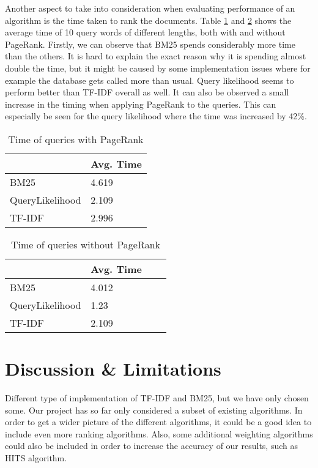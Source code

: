 Another aspect to take into consideration when evaluating performance of an algorithm is the time taken to rank the documents. Table \ref{tab:time} and \ref{tab:time_pr} shows the average time of 10 query words of different lengths, both with and without PageRank. Firstly, we can observe that BM25 spends considerably more time than the others. It is hard to explain the exact reason why it is spending almost double the time, but it might be caused by some implementation issues where for example the database gets called more than usual. Query likelihood seems to perform better than TF-IDF overall as well. It can also be observed a small increase in the timing when applying PageRank to the queries. This can especially be seen for the query likelihood where the time was increased by 42\%.

\begin{table}[!h]
\centering
\caption{Time of queries with PageRank}
\label{tab:time}
\begin{tabular}{|l|l|}
\hline
        & Avg. Time  \\ \hline
BM25            & 4.619 \\ \hline
QueryLikelihood & 2.109\\ \hline
TF-IDF          & 2.996\\ \hline
\end{tabular}
\end{table}

\begin{table}[!h]
\centering
\caption{Time of queries without PageRank}
\label{tab:time_pr}
\begin{tabular}{|l|l|l|l|}
\hline
        & Avg. Time  \\ \hline
BM25            & 4.012\\ \hline
QueryLikelihood & 1.23\\ \hline
TF-IDF          & 2.109 \\ \hline
\end{tabular}
\end{table}



\section{Discussion \& Limitations} %
\label{sec:discussion_&_limitations}

Different type of implementation of TF-IDF and BM25, but we have only chosen some. 
Our project has so far only considered a subset of existing algorithms. In order to get a wider picture of the different algorithms, it could be a good idea to include even more ranking algorithms. Also, some additional weighting algorithms could also be included in order to increase the accuracy of our results, such as HITS algorithm.

